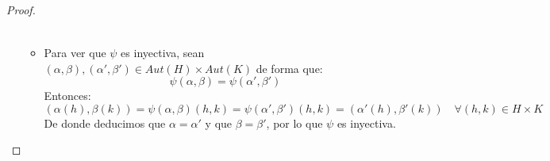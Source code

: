 \begin{prop}
\begin{proof}
\begin{enumerate}
\begin{itemize}
\begin{align*}
                        \end{align*}
                    \item Para ver que $\psi$ es inyectiva, sean $(\alpha,\beta),(\alpha',\beta')\in Aut(H)\times Aut(K)$ de forma que:
                        \begin{equation*}
                            \psi(\alpha,\beta) = \psi(\alpha',\beta')
                        \end{equation*}
                        Entonces:
                        \begin{equation*}
                            (\alpha(h), \beta(k)) = \psi(\alpha,\beta)(h,k) = \psi(\alpha',\beta')(h,k) = (\alpha'(h), \beta'(k)) \quad \forall (h,k)\in H\times K
                        \end{equation*}
                        De donde deducimos que $\alpha = \alpha'$ y que $\beta = \beta'$, por lo que $\psi$ es inyectiva.
                \end{itemize}
        \end{enumerate}
    \end{proof}
\end{prop}

